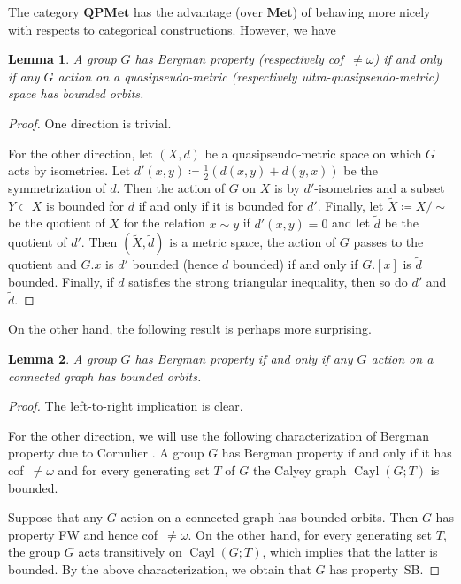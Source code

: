 \documentclass[a4paper]{article}
\newcounter{mycomment}
\newcommand{\mycomment}[2][]{\refstepcounter{mycomment}{\todo[color={green!33},size=\small]{\textbf{Commentaire [\uppercase{#1}\themycomment]:}~#2}}}
\newcommand{\PH}[1]{\todo[color={blue!33},size=small]{#1}}
\newcommand{\GS}[1]{\mycomment[GS]{#1}}
\newtheorem{lem}{Lemma}[section]
\theoremstyle{definition}
\DeclareMathOperator\Cayley{Cayl}
\begin{document}
The category $\mathbf{QPMet}$ has the advantage (over $\mathbf{Met}$) of behaving more nicely with respects to categorical constructions.
However, we have%
%
%
\begin{lem}\label{Lemma:BergQPMet}
A group $G$ has Bergman property (respectively cof~$\neq\omega$) if and only if any $G$ action on a quasipseudo-metric (respectively ultra-quasipseudo-metric) space has bounded orbits.
\end{lem}
\begin{proof}
One direction is trivial.

For the other direction, let $(X,d)$ be a quasipseudo-metric space on which $G$ acts by isometries.
Let $d'(x,y)\coloneqq\frac12(d(x,y)+d(y,x))$ be the symmetrization of $d$.
Then the action of $G$ on $X$ is by $d'$-isometries and a subset $Y\subset X$ is bounded for $d$ if and only if it is bounded for $d'$.
Finally, let $\tilde X\coloneqq X/\sim$ be the quotient of $X$ for the relation $x\sim y$ if $d'(x,y)=0$ and let $\tilde d$ be the quotient of $d'$.
Then $(\tilde X,\tilde d)$ is a metric space, the action of $G$ passes to the quotient and $G.x$ is $d'$ bounded (hence $d$ bounded) if and only if $G.[x]$ is $\tilde d$ bounded.
Finally, if $d$ satisfies the strong triangular inequality, then so do $d'$ and $\tilde d$.
\end{proof}
%
%
On the other hand, the following result is perhaps more surprising.
%
%
\begin{lem}%
A group $G$ has Bergman property if and only if any $G$ action on a connected graph has bounded orbits.
\end{lem}
\begin{proof}
The left-to-right implication is clear.

For the other direction, we will use the following characterization of Bergman property due to Cornulier \cite{MR2240370}. A group $G$ has Bergman property if and only if it has cof~$\neq\omega$ and for every generating set $T$ of $G$ the Calyey graph $\Cayley(G;T)$ is bounded.

Suppose that any $G$ action on a connected graph has bounded orbits. Then $G$ has property FW and hence cof~$\neq\omega$. On the other hand, for every generating set $T$, the group $G$ acts transitively on $\Cayley(G;T)$, which implies that the latter is bounded. By the above characterization, we obtain that $G$ has property~SB.
\end{proof}
\end{document}
